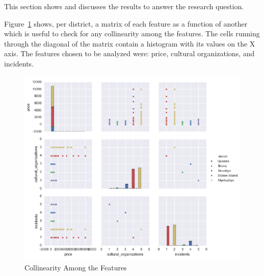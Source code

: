 \documentclass[sigconf]{acmart}
\begin{document}
This section shows and discusses the results to answer the research question.

Figure~\ref{fig:pairwiserelationsprincipalfeatures} shows, per district, a matrix of each feature as a function of another which is useful to check for any collinearity among the features. The cells running through the diagonal of the matrix contain a histogram with its values on the X axis. The features chosen to be analyzed were: price, cultural organizations, and incidents.

\begin{figure}[!htpb]
	\centering
	\includegraphics[width=\linewidth]{images/related_data2}
	\caption{Collinearity Among the Features}
	\label{fig:pairwiserelationsprincipalfeatures}
\end{figure}

\end{document}
